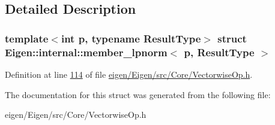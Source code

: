 \subsection{Detailed Description}
\subsubsection*{template$<$int p, typename Result\+Type$>$\newline
struct Eigen\+::internal\+::member\+\_\+lpnorm$<$ p, Result\+Type $>$}



Definition at line \hyperlink{eigen_2_eigen_2src_2_core_2_vectorwise_op_8h_source_l00114}{114} of file \hyperlink{eigen_2_eigen_2src_2_core_2_vectorwise_op_8h_source}{eigen/\+Eigen/src/\+Core/\+Vectorwise\+Op.\+h}.



The documentation for this struct was generated from the following file\+:\begin{DoxyCompactItemize}
\item 
eigen/\+Eigen/src/\+Core/\+Vectorwise\+Op.\+h\end{DoxyCompactItemize}
